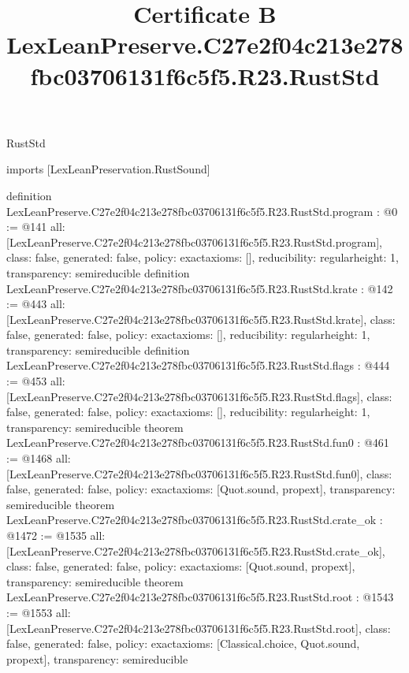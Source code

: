 \begin{lexlean}{RustStd}
\title{Certificate B LexLeanPreserve.C27e2f04c213e278fbc03706131f6c5f5.R23.RustStd}
\begin{coremodule}
imports [LexLeanPreservation.RustSound]

definition LexLeanPreserve.C27e2f04c213e278fbc03706131f6c5f5.R23.RustStd.program : @0 := @141 {
  all: [LexLeanPreserve.C27e2f04c213e278fbc03706131f6c5f5.R23.RustStd.program],
  class: false,
  generated: false,
  policy: exact{axioms: []},
  reducibility: regular{height: 1},
  transparency: semireducible
}
definition LexLeanPreserve.C27e2f04c213e278fbc03706131f6c5f5.R23.RustStd.krate : @142 := @443 {
  all: [LexLeanPreserve.C27e2f04c213e278fbc03706131f6c5f5.R23.RustStd.krate],
  class: false,
  generated: false,
  policy: exact{axioms: []},
  reducibility: regular{height: 1},
  transparency: semireducible
}
definition LexLeanPreserve.C27e2f04c213e278fbc03706131f6c5f5.R23.RustStd.flags : @444 := @453 {
  all: [LexLeanPreserve.C27e2f04c213e278fbc03706131f6c5f5.R23.RustStd.flags],
  class: false,
  generated: false,
  policy: exact{axioms: []},
  reducibility: regular{height: 1},
  transparency: semireducible
}
theorem LexLeanPreserve.C27e2f04c213e278fbc03706131f6c5f5.R23.RustStd.fun0 : @461 := @1468 {
  all: [LexLeanPreserve.C27e2f04c213e278fbc03706131f6c5f5.R23.RustStd.fun0],
  class: false,
  generated: false,
  policy: exact{axioms: [Quot.sound, propext]},
  transparency: semireducible
}
theorem LexLeanPreserve.C27e2f04c213e278fbc03706131f6c5f5.R23.RustStd.crate_ok : @1472 := @1535 {
  all: [LexLeanPreserve.C27e2f04c213e278fbc03706131f6c5f5.R23.RustStd.crate_ok],
  class: false,
  generated: false,
  policy: exact{axioms: [Quot.sound, propext]},
  transparency: semireducible
}
theorem LexLeanPreserve.C27e2f04c213e278fbc03706131f6c5f5.R23.RustStd.root : @1543 := @1553 {
  all: [LexLeanPreserve.C27e2f04c213e278fbc03706131f6c5f5.R23.RustStd.root],
  class: false,
  generated: false,
  policy: exact{axioms: [Classical.choice, Quot.sound, propext]},
  transparency: semireducible
}


\end{coremodule}
\end{lexlean}
